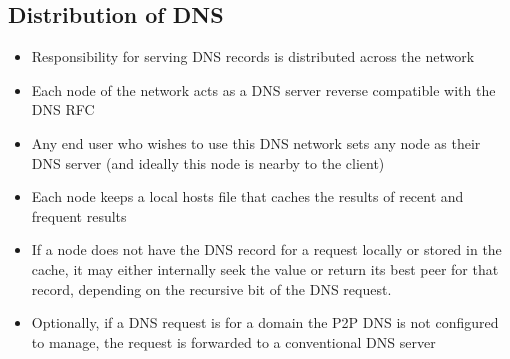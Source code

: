 \documentclass{IEEEtran}
\begin{document}
\subsection{Distribution of DNS}

\begin{itemize}
\item
  Responsibility for serving DNS records is distributed across the
  network
\item
  Each node of the network acts as a DNS server reverse compatible with
  the DNS RFC
\item
  Any end user who wishes to use this DNS network sets any node as their
  DNS server (and ideally this node is nearby to the client)
\item
  Each node keeps a local hosts file that caches the results of recent
  and frequent results
\item
  If a node does not have the DNS record for a request locally or stored
  in the cache, it may either internally seek the value or return its
  best peer for that record, depending on the recursive bit of the DNS
  request.
\item
  Optionally, if a DNS request is for a domain the P2P DNS is not
  configured to manage, the request is forwarded to a conventional DNS
  server
\end{itemize}
\end{document}
